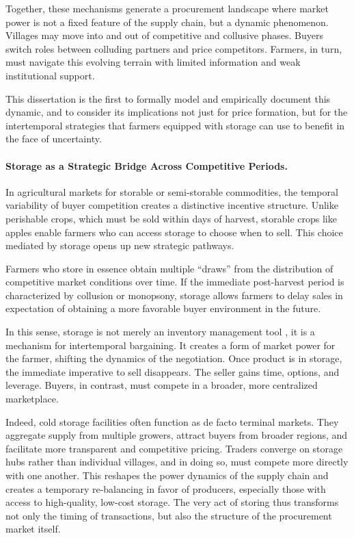 \noindent
Together, these mechanisms generate a procurement landscape where market power is not a fixed feature of the supply chain, but a dynamic phenomenon. Villages may move into and out of competitive and collusive phases. Buyers switch roles between colluding partners and price competitors. Farmers, in turn, must navigate this evolving terrain with limited information and weak institutional support.

This dissertation is the first to formally model and empirically document this dynamic, and to consider its implications not just for price formation, but for the intertemporal strategies that farmers equipped with storage can use to benefit in the face of uncertainty.


\paragraph{Storage as a Strategic Bridge Across Competitive Periods.}
In agricultural markets for storable or semi-storable commodities, the temporal variability of buyer competition creates a distinctive incentive structure. Unlike perishable crops, which must be sold within days of harvest, storable crops like apples enable farmers who can access storage to choose when to sell. This choice mediated by storage opens up new strategic pathways.

Farmers who store in essence obtain multiple ``draws'' from the distribution of competitive market conditions over time. If the immediate post-harvest period is characterized by collusion or monopsony, storage allows farmers to delay sales in expectation of obtaining a more favorable buyer environment in the future.

In this sense, storage is not merely an inventory management tool \citep{goyal2010information}, it is a mechanism for intertemporal bargaining. It creates a form of market power for the farmer, shifting the dynamics of the negotiation. Once product is in storage, the immediate imperative to sell disappears. The seller gains time, options, and leverage. Buyers, in contrast, must compete in a broader, more centralized marketplace.

Indeed, cold storage facilities often function as de facto terminal markets. They aggregate supply from multiple growers, attract buyers from broader regions, and facilitate more transparent and competitive pricing. Traders converge on storage hubs rather than individual villages, and in doing so, must compete more directly with one another. This reshapes the power dynamics of the supply chain and creates a temporary re-balancing in favor of producers, especially those with access to high-quality, low-cost storage. The very act of storing thus transforms not only the timing of transactions, but also the structure of the procurement market itself.


